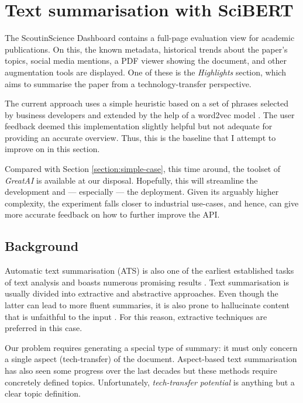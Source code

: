 \section{Text summarisation with SciBERT} \label{section:complex-case}

The ScoutinScience Dashboard contains a full-page evaluation view for academic publications. On this, the known metadata, historical trends about the paper's topics, social media mentions, a PDF viewer showing the document, and other augmentation tools are displayed. One of these is the \textit{Highlights} section, which aims to summarise the paper from a technology-transfer perspective.

The current approach uses a simple heuristic based on a set of phrases selected by business developers and extended by the help of a word2vec model \cite{mikolov2013efficient}. The user feedback deemed this implementation slightly helpful but not adequate for providing an accurate overview. Thus, this is the baseline that I attempt to improve on in this section.

\begin{displayquote}
Compared with Section \ref{section:simple-case}, this time around, the toolset of \textit{GreatAI} is available at our disposal. Hopefully, this will streamline the development and --- especially --- the deployment. Given its arguably higher complexity, the experiment falls closer to industrial use-cases, and hence, can give more accurate feedback on how to further improve the API.
\end{displayquote}

\subsection{Background}

Automatic text summarisation (ATS) is also one of the earliest established tasks of text analysis and boasts numerous promising results \cite{el2021automatic}. Text summarisation is usually divided into extractive and abstractive approaches. Even though the latter can lead to more fluent summaries, it is also prone to hallucinate content that is unfaithful to the input \cite{maynez2020faithfulness}. For this reason, extractive techniques are preferred in this case.

Our problem requires generating a special type of summary: it must only concern a single aspect (tech-transfer) of the document. Aspect-based text summarisation has also seen some progress over the last decades \cite{berkovsky2008aspect,hayashi2021wikiasp} but these methods require concretely defined topics. Unfortunately, \textit{tech-transfer potential} is anything but a clear topic definition.

